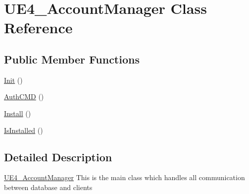 \hypertarget{class_u_e4___account_manager}{\section{U\-E4\-\_\-\-Account\-Manager Class Reference}
\label{class_u_e4___account_manager}
}
\subsection*{Public Member Functions}
\begin{DoxyCompactItemize}
\item 
\hyperlink{class_u_e4___account_manager_a8487f24bc17a5fb3c440807b12784c39}{Init} ()
\item 
\hyperlink{class_u_e4___account_manager_a5ac4d50f77454d7af21c76c7a60baf2d}{Auth\-C\-M\-D} ()
\item 
\hyperlink{class_u_e4___account_manager_ad44656ac65b1fdb9a3b39709c3a757f5}{Install} ()
\item 
\hyperlink{class_u_e4___account_manager_aa6f5d10a7da2bcf6f31c06df2f7268fe}{Is\-Installed} ()
\end{DoxyCompactItemize}


\subsection{Detailed Description}
\hyperlink{class_u_e4___account_manager}{U\-E4\-\_\-\-Account\-Manager} This is the main class which handles all communication between database and clients 

